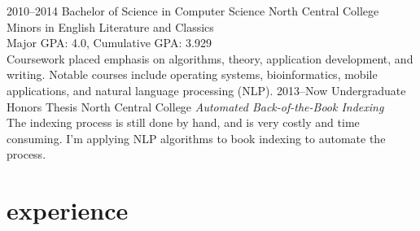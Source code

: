 \documentclass[]{friggeri-cv} %
\begin{document}
\begin{entrylist}
\entry
{2010--2014}
{Bachelor of Science {\normalfont in Computer Science}}
{North Central College}
{Minors in English Literature and Classics \\
Major GPA: 4.0, Cumulative GPA: 3.929 \\
Coursework placed emphasis on algorithms, theory, application development, and writing.
Notable courses include operating systems, bioinformatics, mobile applications, and natural language processing (NLP).}
\entry
{2013--Now}
{Undergraduate {\normalfont Honors Thesis}}
{North Central College}
{\emph{Automated Back-of-the-Book Indexing} \\
The indexing process is still done by hand, and is very costly and time consuming.
I'm applying NLP algorithms to book indexing to automate the process.}

\end{entrylist}


\section{experience}
\end{document}
